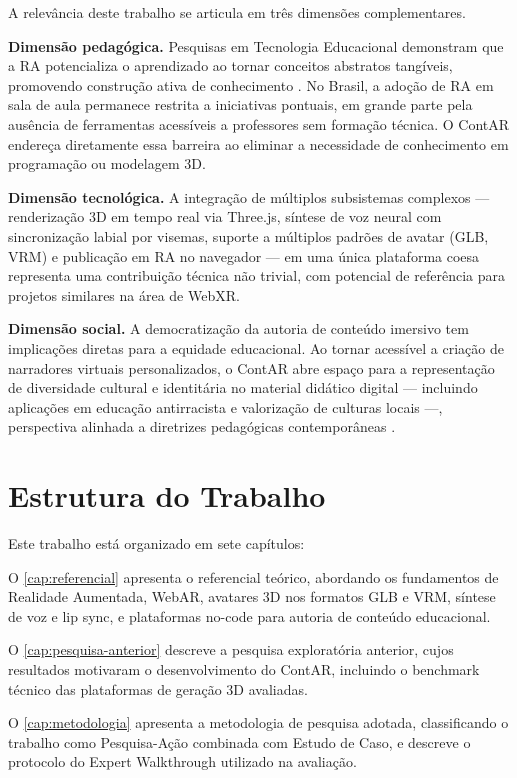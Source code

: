 \documentclass[
  12pt,
  openright,
  twoside,
  a4paper,
  english,
  brazil
]{abntex2}
\begin{document}
A relevância deste trabalho se articula em três dimensões complementares.

\textbf{Dimensão pedagógica.} Pesquisas em Tecnologia Educacional demonstram
que a RA potencializa o aprendizado ao tornar conceitos abstratos tangíveis,
promovendo construção ativa de conhecimento
\cite{fonnet2021review, munoz2021education}. No Brasil, a adoção de RA
em sala de aula permanece restrita a iniciativas pontuais, em grande parte
pela ausência de ferramentas acessíveis a professores sem formação técnica.
O ContAR endereça diretamente essa barreira ao eliminar a necessidade de
conhecimento em programação ou modelagem 3D.

\textbf{Dimensão tecnológica.} A integração de múltiplos subsistemas
complexos — renderização 3D em tempo real via Three.js, síntese de voz
neural com sincronização labial por visemas, suporte a múltiplos padrões
de avatar (GLB, VRM) e publicação em RA no navegador — em uma única
plataforma coesa representa uma contribuição técnica não trivial, com
potencial de referência para projetos similares na área de WebXR.

\textbf{Dimensão social.} A democratização da autoria de conteúdo
imersivo tem implicações diretas para a equidade educacional. Ao tornar
acessível a criação de narradores virtuais personalizados, o ContAR
abre espaço para a representação de diversidade cultural e identitária
no material didático digital — incluindo aplicações em educação antirracista
e valorização de culturas locais —, perspectiva alinhada a diretrizes
pedagógicas contemporâneas \cite{lgbtqieducation}.

\section{Estrutura do Trabalho}
\label{sec:estrutura}

Este trabalho está organizado em sete capítulos:

O \autoref{cap:referencial} apresenta o referencial teórico, abordando
os fundamentos de Realidade Aumentada, WebAR, avatares 3D nos formatos
GLB e VRM, síntese de voz e lip sync, e plataformas no-code para autoria
de conteúdo educacional.

O \autoref{cap:pesquisa-anterior} descreve a pesquisa exploratória anterior,
cujos resultados motivaram o desenvolvimento do ContAR, incluindo o benchmark
técnico das plataformas de geração 3D avaliadas.

O \autoref{cap:metodologia} apresenta a metodologia de pesquisa adotada,
classificando o trabalho como Pesquisa-Ação combinada com Estudo de Caso,
e descreve o protocolo do Expert Walkthrough utilizado na avaliação.
\end{document}
